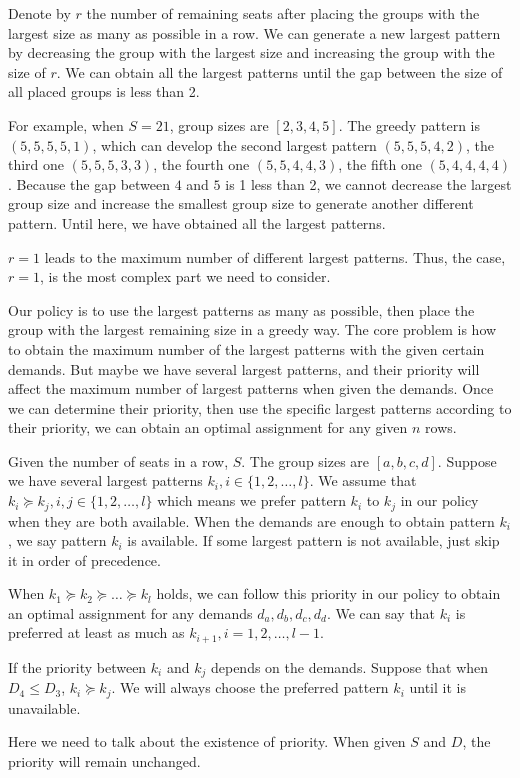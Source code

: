 Denote by $r$ the number of remaining seats after placing the groups with the largest size as many as possible in a row. We can generate a new largest pattern by decreasing the group with the largest size and increasing the group with the size of $r$. We can obtain all the largest patterns until the gap between the size of all placed groups is less than 2.

For example, when $S=21$, group sizes are $[2,3,4,5]$. The greedy pattern is $(5,5,5,5,1)$, which can develop the second largest pattern $(5,5,5,4,2)$, the third one $(5,5,5,3,3)$, the fourth one $(5,5,4,4,3)$, the fifth one $(5,4,4,4,4)$. Because the gap between $4$ and $5$ is 1 less than 2, we cannot decrease the largest group size and increase the smallest group size to generate another different pattern. Until here, we have obtained all the largest patterns.

\begin{remark}
$r=1$ leads to the maximum number of different largest patterns. Thus, the case, $r=1$, is the most complex part we need to consider.
\end{remark}

Our policy is to use the largest patterns as many as possible, then place the group with the largest remaining size in a greedy way. The core problem is how to obtain the maximum number of the largest patterns with the given certain demands. But maybe we have several largest patterns, and their priority will affect the maximum number of largest patterns when given the demands. Once we can determine their priority, then use the specific largest patterns according to their priority, we can obtain an optimal assignment for any given $n$ rows.

\begin{definition}
Given the number of seats in a row, $S$. The group sizes are $[a,b,c,d]$.
Suppose we have several largest patterns $k_i, i\in \{1,2,\ldots,l\}$. We assume that $k_i \succeq k_{j}, i, j\in \{1,2,\ldots,l\}$ which means we prefer pattern $k_i$ to $k_j$ in our policy when they are both available.
When the demands are enough to obtain pattern $k_i$, we say pattern $k_i$ is available. If some largest pattern is not available, just skip it in order of precedence.

When $k_1 \succeq k_2 \succeq \ldots \succeq k_l$ holds, we can follow this priority in our policy to obtain an optimal assignment for any demands $d_a, d_b, d_c, d_d$.
We can say that $k_i$ is preferred at least as much as $k_{i+1}, i = 1,2,\ldots, l-1$.

If the priority between $k_i$ and $k_j$ depends on the demands. Suppose that when $D_4 \leq D_3$, $k_i \succeq k_j$. We will always choose the preferred pattern $k_i$ until it is unavailable.

Here we need to talk about the existence of priority.
When given $S$ and $D$, the priority will remain unchanged.

\end{definition}

